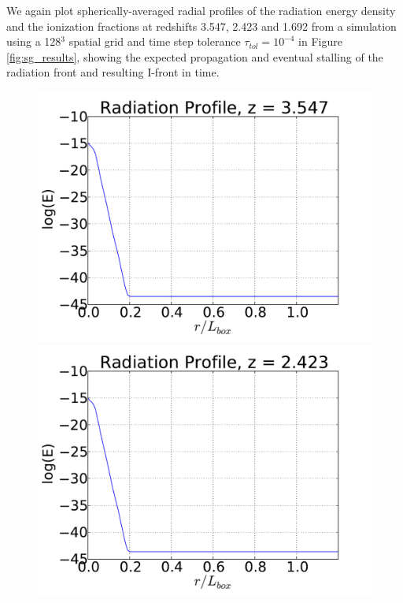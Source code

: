 We again plot spherically-averaged radial profiles of the radiation energy
density and the ionization fractions at redshifts 3.547, 2.423 and 1.692 from a
simulation using a 128$^3$ spatial grid and time step tolerance
$\tau_{tol} = 10^{-4}$ in Figure \ref{fig:sg_results}, showing the
expected propagation and eventual stalling of the radiation front and
resulting I-front in time.
\begin{figure}[t]
\centerline{\hfill
  \includegraphics[scale=0.3, trim=1.0cm 1.0cm 1.0cm 0.5cm]{sg-Eprofiles_01.pdf}
  \includegraphics[scale=0.3, trim=1.0cm 1.0cm 1.0cm 0.5cm]{sg-Eprofiles_05.pdf}
}
\end{figure}
